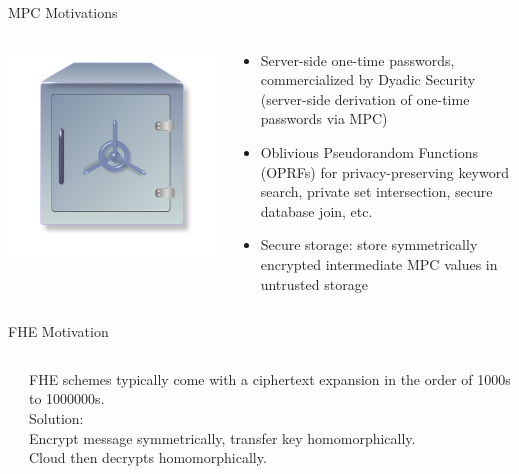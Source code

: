 \documentclass[10pt,compress]{beamer}
\begin{document}
\begin{frame}{MPC Motivations}
\begin{columns}[T]
\begin{column}{0.23\textwidth}
  \includegraphics[scale=0.1]{figures/vault.png}
\end{column}
\begin{column}{0.77\textwidth}
  \begin{itemize}
  \item \alert{Server-side one-time passwords}, commercialized by Dyadic Security (server-side derivation of one-time passwords via MPC)
  \item Oblivious Pseudorandom Functions (OPRFs) for \alert{privacy-preserving keyword search}, \alert{private set intersection}, \alert{secure database join}, etc.
  \item \alert{Secure storage}: store symmetrically encrypted intermediate MPC values in untrusted storage
  \end{itemize}
\end{column}
\end{columns}
\end{frame}

\begin{frame}{FHE Motivation}
\begin{columns}
\begin{column}{.4\textwidth}

\end{column}
\begin{column}{.6\textwidth}
FHE schemes typically come with a ciphertext expansion in the order of \alert{1000s} to
\alert{1000000s}. \\[1cm]

\alert{Solution}:\\
\alert{Encrypt message symmetrically}, transfer key homomorphically.\\
Cloud then decrypts homomorphically.
\end{column}
\end{columns}
\end{frame}
\end{document}
